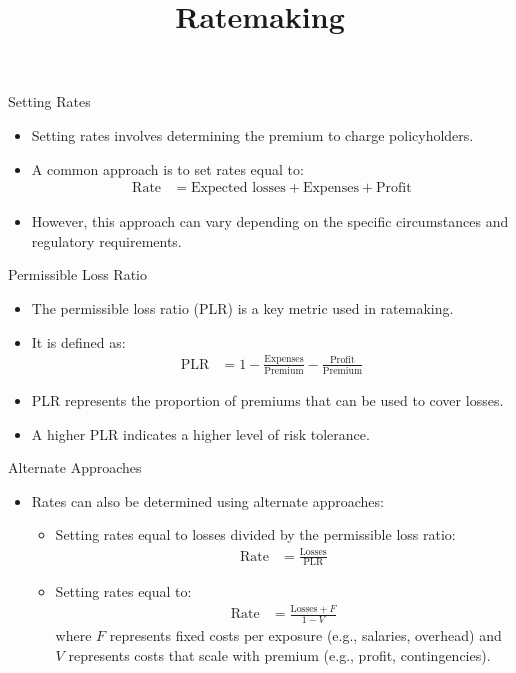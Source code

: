 \documentclass[compress,mathserif]{beamer}
\title{Ratemaking}
\author{}
\institute[Stat 346]{Stat 346 - Short-term Actuarial Math}
\date[ BYU]{}
\begin{document}
\begin{frame}
 \titlepage
\end{frame}


\begin{frame}{Setting Rates}
    \begin{itemize}
        \item Setting rates involves determining the premium to charge policyholders.
        \item A common approach is to set rates equal to:
        \begin{align*}
            \text{Rate} &= \text{Expected losses} + \text{Expenses} + \text{Profit}
        \end{align*}
        \item However, this approach can vary depending on the specific circumstances and regulatory requirements.
    \end{itemize}
\end{frame}

\begin{frame}{Permissible Loss Ratio}
    \begin{itemize}
        \item The permissible loss ratio (PLR) is a key metric used in ratemaking.
        \item It is defined as:
        \begin{align*}
            \text{PLR} &= 1 - \frac{\text{Expenses}}{\text{Premium}} - \frac{\text{Profit}}{\text{Premium}}
        \end{align*}
        \item PLR represents the proportion of premiums that can be used to cover losses.
        \item A higher PLR indicates a higher level of risk tolerance.
    \end{itemize}
\end{frame}

\begin{frame}{Alternate Approaches}
    \begin{itemize}
        \item Rates can also be determined using alternate approaches:
        \begin{itemize}
            \item Setting rates equal to losses divided by the permissible loss ratio:
            \begin{align*}
                \text{Rate} &= \frac{\text{Losses}}{\text{PLR}}
            \end{align*}
            \item Setting rates equal to:
            \begin{align*}
                \text{Rate} &= \frac{\text{Losses} + F}{1 - V}
            \end{align*}
            where $F$ represents fixed costs per exposure (e.g., salaries, overhead) and $V$ represents costs that scale with premium (e.g., profit, contingencies).
        \end{itemize}
    \end{itemize}
\end{frame}
\end{document}
